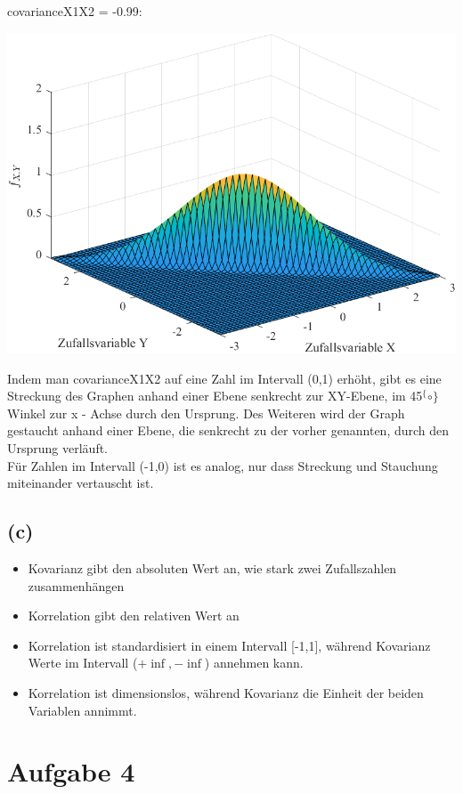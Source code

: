 \documentclass[a4paper]{scrartcl}
\begin{document}
covarianceX1X2 = -0.99:
\begin{center}
	\includegraphics*[scale = 0.5]{question3b4.png}
\end{center}
Indem man covarianceX1X2 auf eine Zahl im Intervall (0,1) erhöht, gibt es eine Streckung des Graphen anhand einer Ebene senkrecht zur XY-Ebene, im 45$^\{\circ\}$ Winkel zur x - Achse durch den Ursprung. Des Weiteren wird der Graph gestaucht anhand einer Ebene, die senkrecht zu der vorher genannten, durch den Ursprung verläuft.\\
Für Zahlen im Intervall (-1,0) ist es analog, nur dass Streckung und Stauchung miteinander vertauscht ist.\\

\subsection*{(c)}
\begin{itemize}
	\item Kovarianz gibt den absoluten Wert an, wie stark  zwei Zufallszahlen zusammenhängen
	\item Korrelation gibt den relativen Wert an
	\item Korrelation ist standardisiert in einem Intervall [-1,1], während Kovarianz Werte im Intervall ($+\inf, -\inf$) annehmen kann. 
	\item Korrelation ist dimensionslos, während Kovarianz die Einheit der beiden Variablen annimmt.
\end{itemize}

\section*{Aufgabe 4}
\end{document}

